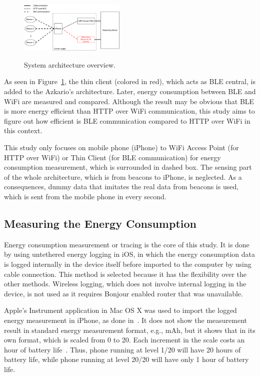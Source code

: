 \documentclass[journal]{vgtc}                %
\begin{document}
\begin{figure}
  \caption{System architecture overview.}
  \centering
    \includegraphics[width=0.45\textwidth]{system-architecture}
  \label{fig:system-architecture}
\end{figure}

As seen in Figure~\ref{fig:system-architecture}, the thin client (colored in red), which acts as BLE central, is added to the Azkario's architecture. Later, energy consumption between BLE and WiFi are measured and compared. Although the result may be obvious that BLE is more energy efficient than HTTP over WiFi communication, this study aims to figure out how efficient is BLE communication compared to HTTP over WiFi in this context.

This study only focuses on mobile phone (iPhone) to WiFi Access Point (for HTTP over WiFi) or Thin Client (for BLE communication) for energy consumption measurement, which is surrounded in dashed box. The sensing part of the whole architecture, which is from beacons to iPhone, is neglected. As a consequences, dummy data that imitates the real data from beacons is used, which is sent from the mobile phone in every second.

\subsection{Measuring the Energy Consumption} %
\label{sub:tracing_}
Energy consumption measurement or tracing is the core of this study. It is done by using untethered energy logging in iOS, in which the energy consumption data is logged internally in the device itself before imported to the computer by using cable connection. This method is selected because it has the flexibility over the other methods. Wireless logging, which does not involve internal logging in the device, is not used as it requires Bonjour enabled router that was unavailable.

Apple's Instrument application in Mac OS X was used to import the logged energy measurement in iPhone, as done in~\cite{Conte2014}. It does not show the measurement result in standard energy measurement format, e.g., mAh, but it shows that in its own format, which is scaled from 0 to 20. Each increment in the scale costs an hour of battery life~\cite{Lucchesi2014}. Thus, phone running at level 1/20 will have 20 hours of battery life, while phone running at level 20/20 will have only 1 hour of battery life.
\end{document}

